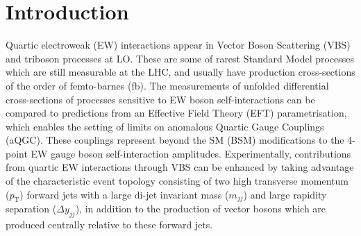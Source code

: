 \documentclass{v23windows}
\def\pt{\ensuremath{p_{\mathrm{T}}}\xspace}
\def\mjj{\ensuremath{m_{jj}}\xspace}
\begin{document}
\section{Introduction}
Quartic electroweak (EW) interactions appear in Vector Boson Scattering (VBS) and triboson processes at LO. These are some of rarest Standard Model processes which are still measurable at the LHC, and usually have production cross-sections of the order of femto-barnes (fb). The measurements of unfolded differential cross-sections of processes sensitive to EW boson self-interactions can be compared to predictions from an Effective Field Theory (EFT) parametrisation, which enables the setting of limits on anomalous Quartic Gauge Couplings (aQGC). These couplings represent beyond the SM (BSM) modifications to the 4-point EW gauge boson self-interaction amplitudes. Experimentally, contributions from quartic EW interactions through VBS can be enhanced by taking advantage of the characteristic event topology consisting of two high transverse momentum (\pt) forward jets with a large di-jet invariant mass (\mjj) and large rapidity separation ($\Delta y_{jj}$), in addition to the production of vector bosons which are produced centrally relative to these forward jets.
\end{document}
